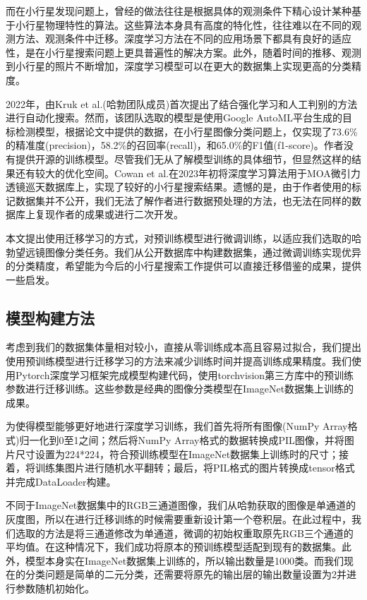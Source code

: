 \documentclass[12pt,a4paper]{article}%
\begin{document}
而在小行星发现问题上，曾经的做法往往是根据具体的观测条件下精心设计某种基于小行星物理特性的算法。这些算法本身具有高度的特化性，往往难以在不同的观测方法、观测条件中迁移。深度学习方法在不同的应用场景下都具有良好的适应性，是在小行星搜索问题上更具普遍性的解决方案。此外，随着时间的推移、观测到小行星的照片不断增加，深度学习模型可以在更大的数据集上实现更高的分类精度。

2022年，由Kruk et al.(哈勃团队成员)首次提出了结合强化学习和人工判别的方法进行自动化搜索。然而，该团队选取的模型是使用Google AutoML平台生成的目标检测模型，根据论文中提供的数据，在小行星图像分类问题上，仅实现了73.6\%的精准度(precision)，58.2\%的召回率(recall)，和65.0\%的F1值(f1-score)。作者没有提供开源的训练模型。尽管我们无从了解模型训练的具体细节，但显然这样的结果还有较大的优化空间。Cowan et al.在2023年初将深度学习算法用于MOA微引力透镜巡天数据库上，实现了较好的小行星搜索结果。遗憾的是，由于作者使用的标记数据集并不公开，我们无法了解作者进行数据预处理的方法，也无法在同样的数据库上复现作者的成果或进行二次开发。

本文提出使用迁移学习的方式，对预训练模型进行微调训练，以适应我们选取的哈勃望远镜图像分类任务。我们从公开数据库中构建数据集，通过微调训练实现优异的分类精度，希望能为今后的小行星搜索工作提供可以直接迁移借鉴的成果，提供一些启发。

\subsection{模型构建方法}

考虑到我们的数据集体量相对较小，直接从零训练成本高且容易过拟合，我们提出使用预训练模型进行迁移学习的方法来减少训练时间并提高训练成果精度。我们使用Pytorch深度学习框架完成模型构建代码，使用torchvision第三方库中的预训练参数进行迁移训练。这些参数是经典的图像分类模型在ImageNet数据集上训练的成果。

为使得模型能够更好地进行深度学习训练，我们首先将所有图像(NumPy Array格式)归一化到0至1之间；然后将NumPy Array格式的数据转换成PIL图像，并将图片尺寸设置为224*224，符合预训练模型在ImageNet数据集上训练时的尺寸；接着，将训练集图片进行随机水平翻转；最后，将PIL格式的图片转换成tensor格式并完成DataLoader构建。

不同于ImageNet数据集中的RGB三通道图像，我们从哈勃获取的图像是单通道的灰度图，所以在进行迁移训练的时候需要重新设计第一个卷积层。在此过程中，我们选取的方法是将三通道修改为单通道，微调的初始权重取原先RGB三个通道的平均值。在这种情况下，我们成功将原本的预训练模型适配到现有的数据集。此外，模型本身实在ImageNet数据集上训练的，所以输出数量是1000类。而我们现在的分类问题是简单的二元分类，还需要将原先的输出层的输出数量设置为2并进行参数随机初始化。
\end{document}
